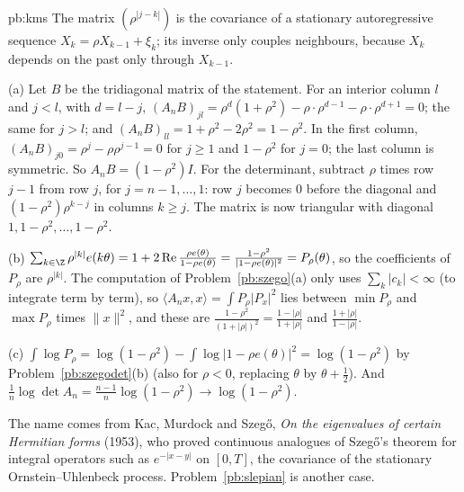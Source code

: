 \begin{solution}{pb:kms}
\idea The matrix $(\rho^{|j-k|})$ is the covariance of a stationary autoregressive sequence $X_k=\rho X_{k-1}+\xi_k$; its inverse only couples neighbours, because $X_k$ depends on the past only
through $X_{k-1}$.

\writeup (a) Let $B$ be the tridiagonal matrix of the statement. For an interior column $l$ and $j<l$, with $d=l-j$,
$(A_nB)_{jl}=\rho^d(1+\rho^2)-\rho\cdot\rho^{d-1}-\rho\cdot\rho^{d+1}=0$; the same for $j>l$; and $(A_nB)_{ll}=1+\rho^2-2\rho^2=1-\rho^2$. In the first column, $(A_nB)_{j0}=\rho^j-\rho\rho^{j-1}=0$ for $j\ge1$ and
$1-\rho^2$ for $j=0$; the last column is symmetric. So $A_nB=(1-\rho^2)I$. For the determinant, subtract $\rho$ times row $j-1$ from row $j$, for $j=n-1,\dots,1$: row $j$ becomes $0$ before
the diagonal and $(1-\rho^2)\rho^{k-j}$ in columns $k\ge j$. The matrix is now triangular with diagonal $1,1-\rho^2,\dots,1-\rho^2$.

(b) $\sum_{k\in\Z}\rho^{|k|}e(k\theta)=1+2\operatorname{Re}\frac{\rho e(\theta)}{1-\rho e(\theta)}=\frac{1-\rho^2}{|1-\rho e(\theta)|^2}=P_\rho(\theta)$, so the coefficients of $P_\rho$ are $\rho^{|k|}$. The computation of
Problem~\ref{pb:szego}(a) only uses $\sum_k|c_k|<\infty$ (to integrate term by term), so $\langle A_nx,x\rangle=\int P_\rho|P_x|^2$ lies between $\min P_\rho$ and $\max P_\rho$ times $\|x\|^2$, and these
are $\frac{1-\rho^2}{(1+|\rho|)^2}=\frac{1-|\rho|}{1+|\rho|}$ and $\frac{1+|\rho|}{1-|\rho|}$.

(c) $\int\log P_\rho=\log(1-\rho^2)-\int\log|1-\rho e(\theta)|^2=\log(1-\rho^2)$ by Problem~\ref{pb:szegodet}(b) (also for $\rho<0$, replacing $\theta$ by $\theta+\frac12$). And
$\frac1n\log\det A_n=\frac{n-1}n\log(1-\rho^2)\to\log(1-\rho^2)$.

\leads The name comes from Kac, Murdock and Szegő, \emph{On the eigenvalues of certain Hermitian forms} (1953), who proved continuous analogues of Szegő's theorem for integral operators such as
$e^{-|x-y|}$ on $[0,T]$, the covariance of the stationary Ornstein--Uhlenbeck process. Problem~\ref{pb:slepian} is another case.
\end{solution}

